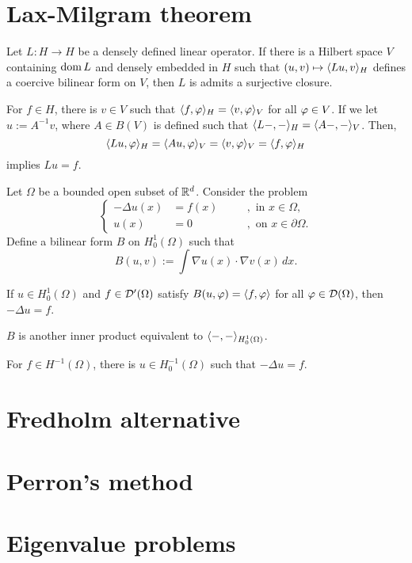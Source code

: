 \documentclass{../../large}
\begin{document}
\section{Lax-Milgram theorem}
\begin{prb}
Let $L:H\to H$ be a densely defined linear operator.
If there is a Hilbert space $V$ containing $\operatorname{dom} L$ and densely embedded in $H$ such that $(u,v)\mapsto\langle Lu,v\rangle_H$ defines a coercive bilinear form on $V$, then $L$ is admits a surjective closure.
\end{prb}
\begin{pf}
For $f\in H$, there is $v\in V$ such that $\langle f,\varphi\rangle_H=\langle v,\varphi\rangle_V$ for all $\varphi\in V$.
If we let $u:=A^{-1}v$, where $A\in B(V)$ is defined such that $\langle L-,-\rangle_H=\langle A-,-\rangle_V$.
Then,
\[\langle Lu,\varphi\rangle_H=\langle Au,\varphi\rangle_V=\langle v,\varphi\rangle_V=\langle f,\varphi\rangle_H\]
implies $Lu=f$.
\end{pf}

\begin{prb}
Let $\Omega$ be a bounded open subset of $\mathbb{R}^d$.
Consider the problem
\[\left\{\begin{alignedat}{2}
-\Delta u(x)&=f(x)&\quad&,\text{ in }x\in\Omega,\\
u(x)&=0&&,\text{ on }x\in\partial\Omega.
\end{alignedat}\right.\]
Define a bilinear form $B$ on $H_0^1(\Omega)$ such that
\[B(u,v):=\int\nabla u(x)\cdot\nabla v(x)\,dx.\]
\begin{parts}
\item If $u\in H_0^1(\Omega)$ and $f\in\mathcal{D}'(\Omega)$ satisfy $B(u,\varphi)=\langle f,\varphi\rangle$ for all $\varphi\in\mathcal{D}(\Omega)$, then $-\Delta u=f$.
\item $B$ is another inner product equivalent to $\langle-,-\rangle_{H_0^1(\Omega)}$.
\item For $f\in H^{-1}(\Omega)$, there is $u\in H_0^{-1}(\Omega)$ such that $-\Delta u=f$.
\end{parts}
\end{prb}

\section{Fredholm alternative}

\section{Perron's method}

\section{Eigenvalue problems}
\end{document}
